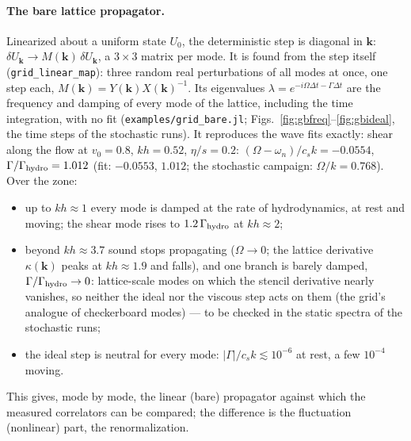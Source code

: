 \documentclass[11pt,aps,preprint,nofootinbib,superscriptaddress,tightenlines]{revtex4-2}
\let\oldparagraph\paragraph
\renewcommand{\paragraph}{\par\bigskip\oldparagraph}
\begin{document}
\paragraph{The bare lattice propagator.}  Linearized about a uniform state $U_0$, the deterministic step is
diagonal in $\bm k$: $\delta U_{\bm k}\to M(\bm k)\,\delta U_{\bm k}$, a $3\times3$ matrix per mode.  It is found from the step
itself (\texttt{grid\_linear\_map}): three random real perturbations of all modes at once, one step each,
$M(\bm k)=Y(\bm k)X(\bm k)^{-1}$.  Its eigenvalues $\lambda=e^{-i\Omega\Delta t-\Gamma\Delta t}$ are the frequency and damping of
every mode of the lattice, including the time integration, with no fit
(\texttt{examples/grid\_bare.jl}; Figs.~\ref{fig:gbfreq}--\ref{fig:gbideal}, the time steps of the stochastic runs).  It
reproduces the wave fits exactly: shear along the flow at $v_0=0.8$, $kh=0.52$, $\eta/s=0.2$:
$(\Omega-\omega_n)/c_sk=-0.0554$, $\Gamma/\Gamma_{\rm hydro}=1.012$ (fit: $-0.0553$, $1.012$; the stochastic campaign:
$\Omega/k=0.768$).  Over the zone:
\begin{itemize}
\item up to $kh\approx1$ every mode is damped at the rate of hydrodynamics, at rest and moving; the shear
  mode rises to $1.2\,\Gamma_{\rm hydro}$ at $kh\approx2$;
\item beyond $kh\approx3.7$ sound stops propagating ($\Omega\to0$; the lattice derivative $\kappa(\bm k)$ peaks at $kh\approx1.9$ and
  falls), and one branch is barely damped, $\Gamma/\Gamma_{\rm hydro}\to0$: lattice-scale modes on which the stencil
  derivative nearly vanishes, so neither the ideal nor the viscous step acts on them (the grid's
  analogue of checkerboard modes) --- to be checked in the static spectra of the stochastic runs;
\item the ideal step is neutral for every mode: $|\Gamma|/c_sk\lesssim10^{-6}$ at rest, a few $10^{-4}$ moving.
\end{itemize}
This gives, mode by mode, the linear (bare) propagator against which the measured correlators can be
compared; the difference is the fluctuation (nonlinear) part, the renormalization.
\end{document}
